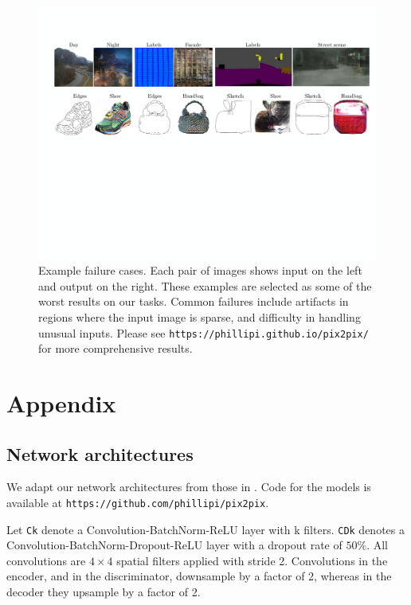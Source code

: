\documentclass[10pt,twocolumn,letterpaper]{article}
\begin{document}



\begin{figure}
 \centering
 \includegraphics[width=1.0\hsize]{figs/failure_cases.pdf}
 \vspace{-0.2in}
  \caption{Example failure cases. Each pair of images shows input on the left and output on the right. These examples are selected as some of the worst results on our tasks. Common failures include artifacts in regions where the input image is sparse, and difficulty in handling unusual inputs. Please see \texttt{https://phillipi.github.io/pix2pix/} for more comprehensive results.}
 \label{failure_cases}
\end{figure}


\clearpage{\thispagestyle{empty}\cleardoublepage}
{\small


}


\clearpage

\section{Appendix}

\subsection{Network architectures}

We adapt our network architectures from those in \cite{radford2015unsupervised}. Code for the models is available at \texttt{https://github.com/phillipi/pix2pix}.

Let \texttt{Ck} denote a Convolution-BatchNorm-ReLU layer with k filters. \texttt{CDk} denotes a Convolution-BatchNorm-Dropout-ReLU layer with a dropout rate of $50\%$. All convolutions are $4 \times 4$ spatial filters applied with stride 2. Convolutions in the encoder, and in the discriminator, downsample by a factor of 2, whereas in the decoder they upsample by a factor of 2.
\end{document}
